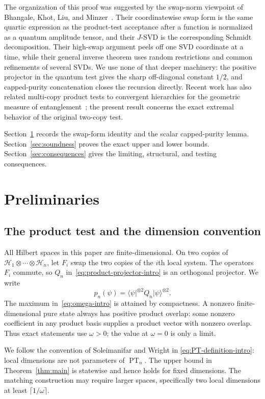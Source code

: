\documentclass[11pt]{article}
\theoremstyle{definition}
\theoremstyle{remark}
\newcommand{\PT}{\operatorname{PT}}
\newcommand{\ket}[1]{\lvert #1\rangle}
\newcommand{\bra}[1]{\langle #1\rvert}
\begin{document}
The organization of this proof was suggested by the swap-norm viewpoint of
Bhangale, Khot, Liu, and Minzer~\cite{BKLM24}.  Their coordinatewise swap
form is the same quartic expression as the product-test acceptance after a
function is normalized as a quantum amplitude tensor, and their
$J$-SVD is the corresponding Schmidt decomposition.  Their high-swap
argument peels off one SVD coordinate at a time, while their general inverse
theorem uses random restrictions and common refinements of several SVDs.
We use none of that deeper machinery: the positive projector in the quantum
test gives the sharp off-diagonal constant $1/2$, and capped-purity
concatenation closes the recursion directly.  Recent work has also related
multi-copy product tests to convergent hierarchies for the geometric measure
of entanglement~\cite{WeinbrennerEtAl26}; the present result concerns the
exact extremal behavior of the original two-copy test.

Section~\ref{sec:preliminaries} records the swap-form identity and the
scalar capped-purity lemma.  Section~\ref{sec:soundness} proves the exact
upper and lower bounds.  Section~\ref{sec:consequences} gives the limiting,
structural, and testing consequences.

\section{Preliminaries}\label{sec:preliminaries}

\subsection{The product test and the dimension convention}

All Hilbert spaces in this paper are finite-dimensional.  On two copies of
$\mathcal H_1\otimes\cdots\otimes\mathcal H_n$, let $F_i$ swap the two
copies of the $i$th local system.  The operators $F_i$ commute, so
$Q_n$ in~\eqref{eq:product-projector-intro} is an orthogonal projector.
We write
\[
  p_n(\psi)=\bra{\psi}^{\otimes2}Q_n\ket{\psi}^{\otimes2}.
\]
The maximum in~\eqref{eq:omega-intro} is attained by compactness.  A
nonzero finite-dimensional pure state always has positive product overlap:
some nonzero coefficient in any product basis supplies a product vector
with nonzero overlap.  Thus exact statements use $\omega>0$; the value at
$\omega=0$ is only a limit.

We follow the convention of Soleimanifar and Wright in
\eqref{eq:PT-definition-intro}: local dimensions are not parameters of
$\PT_n$.  The upper bound in Theorem~\ref{thm:main} is statewise and hence
holds for fixed dimensions.  The matching construction may require larger
spaces, specifically two local dimensions at least
$\lceil1/\omega\rceil$.
\end{document}
